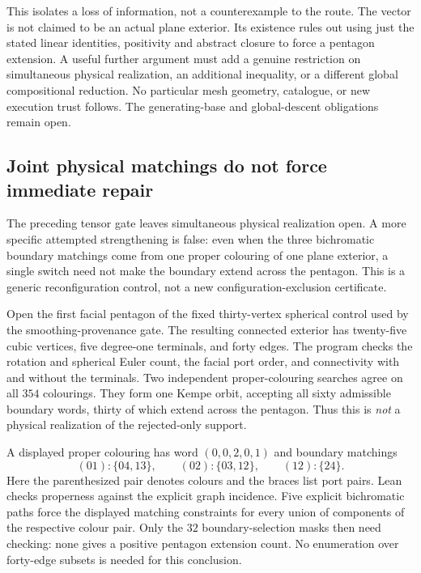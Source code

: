 This isolates a loss of information, not a counterexample to the route.
The vector is not claimed to be an actual plane exterior. Its existence
rules out using just the stated linear identities, positivity and
abstract closure to force a pentagon extension. A useful further argument
must add a genuine restriction on simultaneous physical realization,
an additional inequality, or a different global compositional reduction.
No particular mesh geometry, catalogue, or new execution trust follows.
The generating-base and global-descent obligations remain open.

\subsection{Joint physical matchings do not force immediate repair}
\label{sec:pentagon-kempe-plateau}

The preceding tensor gate leaves simultaneous physical realization open.
A more specific attempted strengthening is false: even when the three
bichromatic boundary matchings come from one proper colouring of one plane
exterior, a single switch need not make the boundary extend across the
pentagon. This is a generic reconfiguration control, not a new
configuration-exclusion certificate.

Open the first facial pentagon of the fixed thirty-vertex spherical control
used by the smoothing-provenance gate. The resulting connected exterior
has twenty-five cubic vertices, five degree-one terminals, and forty edges.
The program checks the rotation and spherical Euler count, the facial port
order, and connectivity with and without the terminals. Two independent
proper-colouring searches agree on all $354$ colourings. They form one
Kempe orbit, accepting all sixty admissible boundary words, thirty of which
extend across the pentagon. Thus this is \emph{not} a physical realization
of the rejected-only support.

A displayed proper colouring has word $(0,0,2,0,1)$ and boundary matchings
\[
 (01):\{04,13\},\qquad (02):\{03,12\},\qquad (12):\{24\}.
\]
Here the parenthesized pair denotes colours and the braces list port pairs.
Lean checks properness against the explicit graph incidence.
Five explicit bichromatic paths force the displayed matching constraints
for every union of components of the respective colour pair.
Only the $32$ boundary-selection masks then need checking: none gives a
positive pentagon extension count. No enumeration over forty-edge subsets
is needed for this conclusion.

